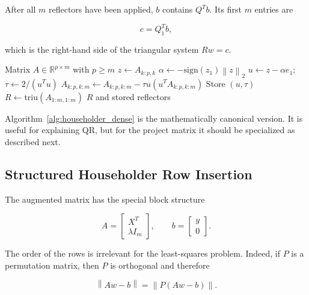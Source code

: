 \documentclass[11pt,a4paper]{article}
\newcommand{\R}{\mathbb{R}}
\newcommand{\norm}[1]{\left\|#1\right\|}
\begin{document}
After all $m$ reflectors have been applied, $b$ contains $Q^T b$. Its first
$m$ entries are

\begin{equation}
    c = Q_1^T b,
\end{equation}

which is the right-hand side of the triangular system $Rw=c$.

\begin{algorithm}[H]
\caption{Compact Dense Householder QR}
\label{alg:householder_dense}
\begin{algorithmic}[1]
    \Require Matrix $A\in\R^{p\times m}$ with $p\geq m$
        \State $z \gets A_{k:p,k}$
        \State $\alpha \gets -\text{sign}(z_1)\norm{z}_2$
        \State $u \gets z-\alpha e_1$; \quad $\tau \gets 2/(u^Tu)$
        \State $A_{k:p,k:m} \gets A_{k:p,k:m} - \tau u(u^TA_{k:p,k:m})$
        \State Store $(u,\tau)$
    \EndFor
    \State $R \gets \mathrm{triu}(A_{1:m,1:m})$
    \State \Return $R$ and stored reflectors
\end{algorithmic}
\end{algorithm}

Algorithm~\ref{alg:householder_dense} is the mathematically canonical version. It is 
useful for explaining QR, but for the project matrix it should be specialized as 
described next.

\subsection{Structured Householder Row Insertion}

\label{sec:structured_householder} The augmented matrix has the special block structure

\begin{equation}
    A = \begin{bmatrix} X^T \\
    \lambda I_m \end{bmatrix}, \qquad b = \begin{bmatrix} y \\
    0 \end{bmatrix}.
\end{equation}

The order of the rows is irrelevant for the least-squares problem. Indeed, if $P$ is a permutation matrix, then $P$ is orthogonal and therefore

\begin{equation}
    \norm{Aw-b} = \norm{P(Aw-b)}.
\end{equation}
\end{document}

